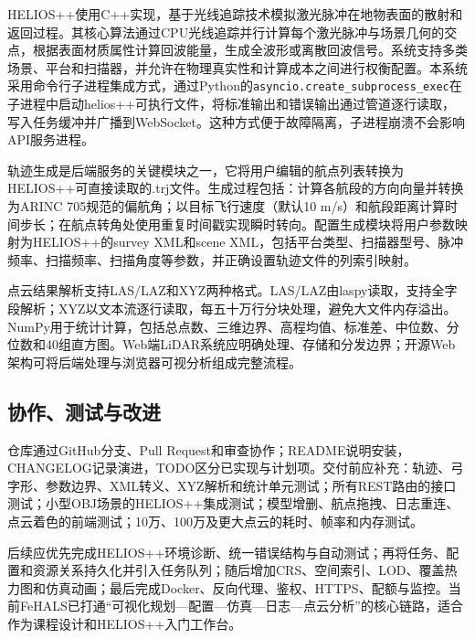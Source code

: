 \documentclass[a4paper,fleqn]{cas-sc}
\begin{document}
HELIOS++使用C++实现，基于光线追踪技术模拟激光脉冲在地物表面的散射和返回过程\citep{heliosPlusPlus,heliosPlusPlus2}。其核心算法通过CPU光线追踪并行计算每个激光脉冲与场景几何的交点，根据表面材质属性计算回波能量，生成全波形或离散回波信号。系统支持多类场景、平台和扫描器，并允许在物理真实性和计算成本之间进行权衡配置。本系统采用命令行子进程集成方式，通过Python的\texttt{asyncio.create\_subprocess\_exec}在子进程中启动helios++可执行文件，将标准输出和错误输出通过管道逐行读取，写入任务缓冲并广播到WebSocket。这种方式便于故障隔离，子进程崩溃不会影响API服务进程。

轨迹生成是后端服务的关键模块之一，它将用户编辑的航点列表转换为HELIOS++可直接读取的.trj文件。生成过程包括：计算各航段的方向向量并转换为ARINC 705规范的偏航角；以目标飞行速度（默认10 m/s）和航段距离计算时间步长；在航点转角处使用重复时间戳实现瞬时转向。配置生成模块将用户参数映射为HELIOS++的survey XML和scene XML，包括平台类型、扫描器型号、脉冲频率、扫描频率、扫描角度等参数，并正确设置轨迹文件的列索引映射。

点云结果解析支持LAS/LAZ和XYZ两种格式。LAS/LAZ由laspy读取\citep{laspy}，支持全字段解析；XYZ以文本流逐行读取，每五十万行分块处理，避免大文件内存溢出。NumPy用于统计计算，包括总点数、三维边界、高程均值、标准差、中位数、分位数和40组直方图。Web端LiDAR系统应明确处理、存储和分发边界\citep{lidarWebgis}；开源Web架构可将后端处理与浏览器可视分析组成完整流程\citep{viswebdrone}。

\subsection{协作、测试与改进}

仓库通过GitHub分支、Pull Request和审查协作；README说明安装，CHANGELOG记录演进，TODO区分已实现与计划项。交付前应补充：轨迹、弓字形、参数边界、XML转义、XYZ解析和统计单元测试；所有REST路由的接口测试；小型OBJ场景的HELIOS++集成测试；模型增删、航点拖拽、日志重连、点云着色的前端测试；10万、100万及更大点云的耗时、帧率和内存测试。

后续应优先完成HELIOS++环境诊断、统一错误结构与自动测试；再将任务、配置和资源关系持久化并引入任务队列；随后增加CRS、空间索引、LOD、覆盖热力图和仿真动画；最后完成Docker、反向代理、鉴权、HTTPS、配额与监控。当前FeHALS已打通\enquote{可视化规划—配置—仿真—日志—点云分析}的核心链路，适合作为课程设计和HELIOS++入门工作台。
\end{document}

